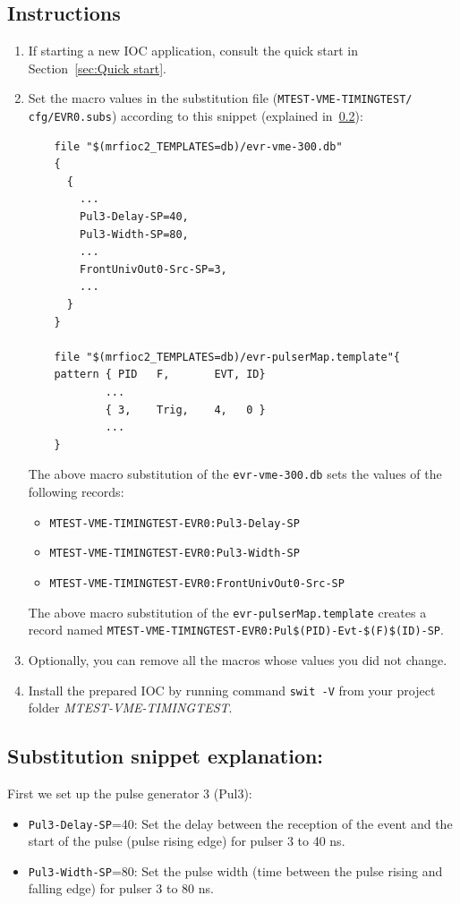\documentclass[12pt,a4paper]{article}
\begin{document}
\subsection{Instructions}
\begin{enumerate}
	\item If starting a new IOC application, consult the quick start in Section~\ref{sec:Quick start}.

	\item Set the macro values in the substitution file (\texttt{MTEST-VME-TIMINGTEST/} \texttt{cfg/EVR0.subs}) according to this snippet (explained in~\ref{sec:explain_pulser}):
\begin{verbatim}
	file "$(mrfioc2_TEMPLATES=db)/evr-vme-300.db"
	{
	  {
	    ...
	    Pul3-Delay-SP=40,
	    Pul3-Width-SP=80,
	    ...
	    FrontUnivOut0-Src-SP=3,
	    ...
	  }
	}

	file "$(mrfioc2_TEMPLATES=db)/evr-pulserMap.template"{
	pattern { PID   F,       EVT, ID}
	        ...
	        { 3,    Trig,    4,   0 }
	        ...
	}
\end{verbatim}
	The above macro substitution of the \texttt{evr-vme-300.db} sets the values of the following records:
	\begin{itemize}
	\item \texttt{MTEST-VME-TIMINGTEST-EVR0:Pul3-Delay-SP}
	\item \texttt{MTEST-VME-TIMINGTEST-EVR0:Pul3-Width-SP}
	\item \texttt{MTEST-VME-TIMINGTEST-EVR0:FrontUnivOut0-Src-SP}
	\end{itemize}
	The above macro substitution of the \texttt{evr-pulserMap.template} creates a record named \texttt{MTEST-VME-TIMINGTEST-EVR0:Pul\$(PID)-Evt-\$(F)\$(ID)-SP}.
	\item Optionally, you can remove all the macros whose values you did not change. 
	\item Install the prepared IOC by running command \texttt{swit -V} from your project folder \textit{MTEST-VME-TIMINGTEST}.
\end{enumerate}
\subsection{Substitution snippet explanation:}\label{sec:explain_pulser}

First we set up the pulse generator 3 (Pul3):
\begin{itemize}
	\item \texttt{Pul3-Delay-SP}=40: Set the delay between the reception of the event and the start of the pulse (pulse rising edge) for pulser 3 to 40 ns. 
	\item \texttt{Pul3-Width-SP}=80: Set the pulse width (time between the pulse rising and falling edge) for pulser 3 to 80 ns.
\end{itemize}
\end{document}
